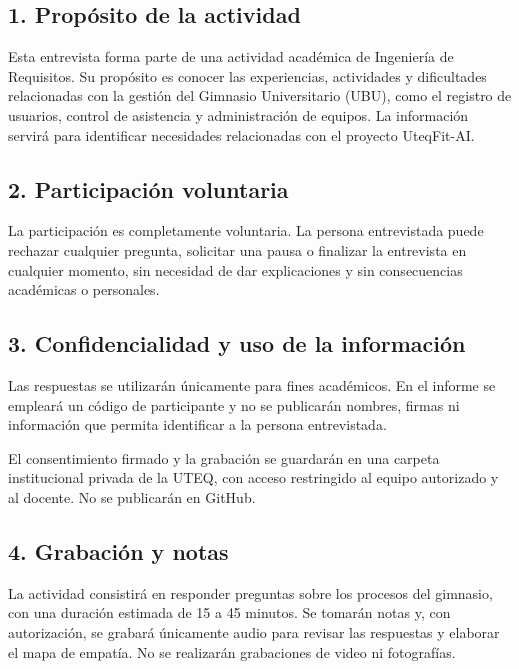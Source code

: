 \documentclass[10pt,letterpaper]{article}
\begin{document}
\subsection*{\textcolor{azul}{1. Propósito de la actividad}}

Esta entrevista forma parte de una actividad académica de Ingeniería de Requisitos. Su propósito es conocer las experiencias, actividades y dificultades relacionadas con la gestión del Gimnasio Universitario (UBU), como el registro de usuarios, control de asistencia y administración de equipos. La información servirá para identificar necesidades relacionadas con el proyecto UteqFit-AI.

\subsection*{\textcolor{azul}{2. Participación voluntaria}}

La participación es completamente voluntaria. La persona entrevistada puede rechazar cualquier pregunta, solicitar una pausa o finalizar la entrevista en cualquier momento, sin necesidad de dar explicaciones y sin consecuencias académicas o personales.

\subsection*{\textcolor{azul}{3. Confidencialidad y uso de la información}}

Las respuestas se utilizarán únicamente para fines académicos. En el informe se empleará un código de participante y no se publicarán nombres, firmas ni información que permita identificar a la persona entrevistada.

El consentimiento firmado y la grabación se guardarán en una carpeta institucional privada de la UTEQ, con acceso restringido al equipo autorizado y al docente. No se publicarán en GitHub.

\subsection*{\textcolor{azul}{4. Grabación y notas}}

La actividad consistirá en responder preguntas sobre los procesos del gimnasio, con una duración estimada de 15 a 45 minutos. Se tomarán notas y, con autorización, se grabará únicamente audio para revisar las respuestas y elaborar el mapa de empatía. No se realizarán grabaciones de video ni fotografías.
\end{document}
